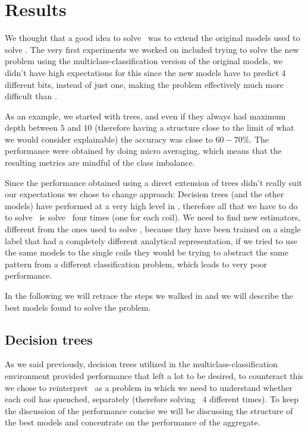 \section{Results}
We thought that a good idea to solve \qlp\ was to extend the original models used to solve \qrp. The
very first experiments we worked on included trying to solve the new problem using the
multiclass-classification version of the original models, we didn't have high expectations for this
since the new models have to predict $4$ different bits, instead of just one, making the problem
effectively much more difficult than \qrp.

As an example, we started with trees, and even if they always had maximum depth between $5$ and $10$
(therefore having a structure close to the limit of what we would consider explainable) the accuracy
was close to $60 - 70\%$. The performance were obtained by doing micro averaging, which means that
the resulting metrics are mindful of the class imbalance.

Since the performance obtained using a direct extension of trees didn't really suit our expectations
we chose to change approach: Decision trees (and the other models) have performed at a very high
level in \qrp, therefore all that we have to do to solve \qlp\ is solve \qrp\ four times (one for
each coil). We need to find new estimators, different from the ones used to solve \qrp, because they
have been trained on a single label that had a completely different analytical representation, if we
tried to use the same models to the single coils they would be trying to abstract the same pattern
from a different classification problem, which leads to very poor performance.

In the following we will retrace the steps we walked in  and we will describe the best
models found to solve the problem.

\subsection{Decision trees}
As we said previously, decision trees utilized in the multiclass-classification environment provided
performance that left a lot to be desired, to counteract this we chose to reinterpret \qlp\ as a
problem in which we need to understand whether each coil has quenched, separately (therefore
solving \qrp\ $4$ different times). To keep the discussion of the performance concise we will be
discussing the structure of the best models and concentrate on the performance of the aggregate.

